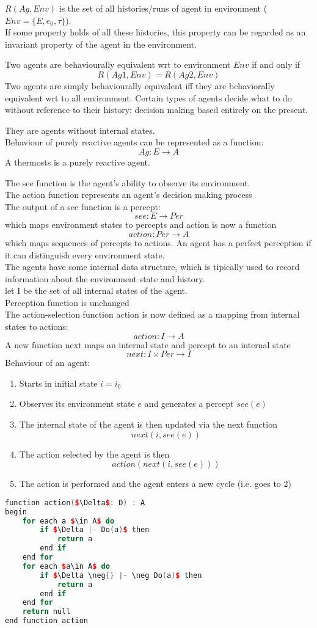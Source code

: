 $R(Ag, Env)$ is the set of all histories/runs of agent in environment ($Env = \{E, e_0, \tau\}$).\\
If some property holds of all these histories, this property can be regarded as an invariant property of the agent in the environment.

Two agents are behaviourally equivalent wrt to environment $Env$ if and only if
\[R(Ag1, Env) = R(Ag2, Env)\]
Two agents are simply behaviourally equivalent iff they are behaviorally equivalent wrt to all environment.
Certain types of agents  decide what to do without reference to their history: decision making based entirely on the present.

They are agents without internal states.\\
Behaviour of purely reactive agents can be represented as a function:
\[Ag: E\rightarrow A\]
A thermosts is a purely reactive agent.

The see function is the agent's ability to observe its environment.\\
The action function represents an agent's decision making process\\
The output of a see function is a percept:
\[see: E\rightarrow Per\]
which maps environment states to percepts and action is now a function
\[action: Per\rightarrow A\]
which maps sequences of percepts to actions.
An agent has a perfect perception if it can distinguish every environment state.\\

The agents have some internal data structure, which is tipically used to record information about the environment state and history.\\
let I be the set of all internal states of the agent.\\
Perception function is unchanged\\
The action-selection function action is now defined as a mapping from internal states to actions:
\[action: I \rightarrow A\]
A new function next maps an internal state and percept to an internal state
\[next: I \times Per \rightarrow I\]
Behaviour of an agent:
\begin{enumerate}
\item Starts in initial state $i=i_0$
\item Observes its environment state $e$ and generates a percept $see(e)$
\item The internal state of the agent is then updated via the next function
\[next(i, see(e))\]
\item The action selected by the agent is then 
\[action(next(i, see(e)))\]
\item The action is performed and the agent enters a new cycle (i.e. goes to 2)
\end{enumerate}
\begin{lstlisting}[language=C++]
function action($\Delta$: D) : A
begin
	for each a $\in A$ do 
		if $\Delta |- Do(a)$ then 
			return a
		end if
	end for
	for each $a\in A$ do
		if $\Delta \neg{} |- \neg Do(a)$ then 
			return a
		end if
	end for
	return null
end function action
\end{lstlisting}

